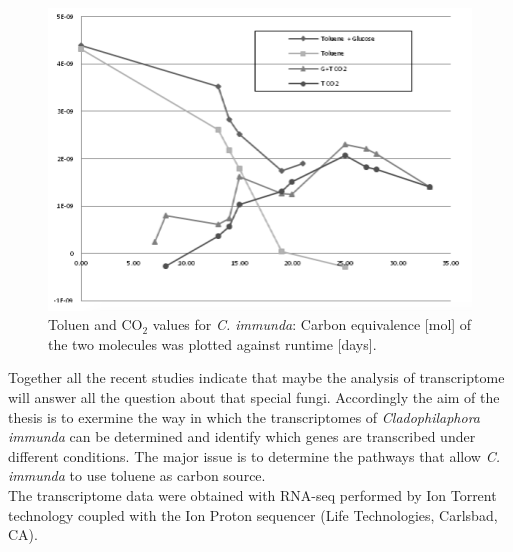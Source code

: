 \documentclass[12pt, a4paper]{report}
\begin{document}
\begin{figure}[H]
	\centering	
	\includegraphics[width=400pt]{pics/GCresults.png}
	\caption[Toluen and CO$_2$ values for \textit{C. immunda}]
	{Toluen and CO$_2$ values for \textit{C. immunda}: Carbon equivalence [mol] of the two molecules was plotted against runtime [days]. \cite{Poyntner2014}}
	\label{GCresults}
\end{figure}

Together all the recent studies indicate that maybe the analysis of transcriptome will answer all the question about that special fungi.
Accordingly the aim of the thesis is to exermine the way in which the transcriptomes of \textit{Cladophilaphora immunda} can be determined and identify which genes are transcribed under different conditions. The major issue is to determine the pathways that allow \textit{C. immunda} to use toluene as carbon source.\\ 
The transcriptome data were obtained with RNA-seq performed by Ion Torrent technology coupled with the Ion Proton sequencer (Life Technologies, Carlsbad, CA). \cite{BarbaraBlasi2015}
\vfill
\end{document}

